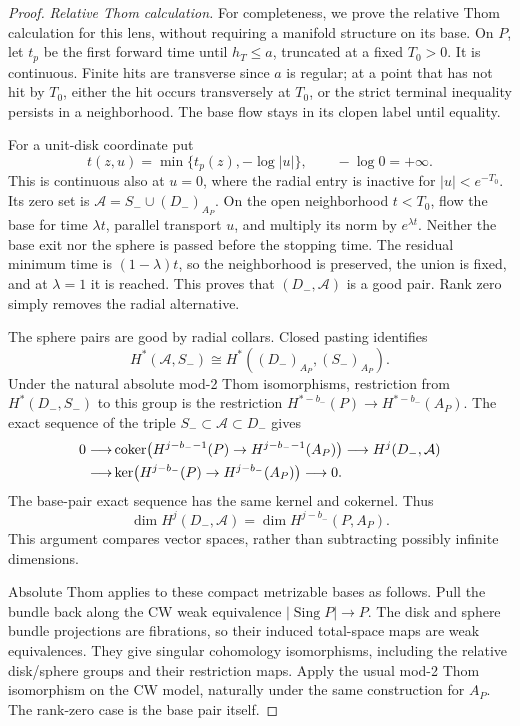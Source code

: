 \begin{proof}
\emph{Relative Thom calculation.}
For completeness, we prove the relative Thom calculation
for this lens, without requiring a manifold structure on
its base.  On \(P\), let \(t_p\) be the first forward
time until \(h_T\le a\), truncated at a fixed \(T_0>0\).
It is continuous.  Finite hits are transverse since
\(a\) is regular; at a point that has not hit by
\(T_0\), either the hit occurs transversely at \(T_0\),
or the strict terminal inequality persists in a
neighborhood.  The base flow stays in its clopen
label until equality.

For a unit-disk coordinate put
\[
 t(z,u)=\min\{t_p(z),-\log|u|\},\qquad -\log0=+\infty.
\]
This is continuous also at \(u=0\), where the radial
entry is inactive for \(|u|<e^{-T_0}\).
Its zero set is
\(\mathcal A=S_-\cup(D_-)_{A_P}\).
On the open neighborhood \(t<T_0\), flow the base
for time \(\lambda t\), parallel transport \(u\),
and multiply its norm by \(e^{\lambda t}\).
Neither the base exit nor the sphere is passed before
the stopping time.  The residual minimum time is
\((1-\lambda)t\), so the neighborhood is preserved,
the union is fixed, and at \(\lambda=1\) it is reached.
This proves that \((D_-,\mathcal A)\) is a good pair.
Rank zero simply removes the radial alternative.

The sphere pairs are good by radial collars.
Closed pasting identifies
\[
 H^*(\mathcal A,S_-)
       \cong H^*((D_-)_{A_P},(S_-)_{A_P}).
\]
Under the natural absolute mod-2 Thom isomorphisms,
restriction from \(H^*(D_-,S_-)\) to this group is
the restriction \(H^{*-b_-}(P)\to H^{*-b_-}(A_P)\).
The exact sequence of the triple
\(S_-\subset\mathcal A\subset D_-\) gives
\[
\begin{split}
0\longrightarrow&
\operatorname{coker}\bigl(H^{j-b_--1}(P)\to H^{j-b_--1}(A_P)\bigr)
\longrightarrow H^j(D_-,\mathcal A)\\
\longrightarrow&
\ker\bigl(H^{j-b_-}(P)\to H^{j-b_-}(A_P)\bigr)
\longrightarrow0.
\end{split}
\]
The base-pair exact sequence has the same kernel
and cokernel.  Thus
\begin{equation}\label{eq:local-thom-dimension}
 \dim H^j(D_-,\mathcal A)
                    =\dim H^{j-b_-}(P,A_P).
\end{equation}
This argument compares vector spaces, rather than
subtracting possibly infinite dimensions.

Absolute Thom applies to these compact metrizable
bases as follows.  Pull the bundle back along the
CW weak equivalence \(|\operatorname{Sing}P|\to P\).
The disk and sphere bundle projections are fibrations,
so their induced total-space maps are weak equivalences.
They give singular cohomology isomorphisms, including
the relative disk/sphere groups and their restriction
maps.  Apply the usual mod-2 Thom isomorphism on the
CW model, naturally under the same construction for
\(A_P\).  The rank-zero case is the base pair itself.


\end{proof}

